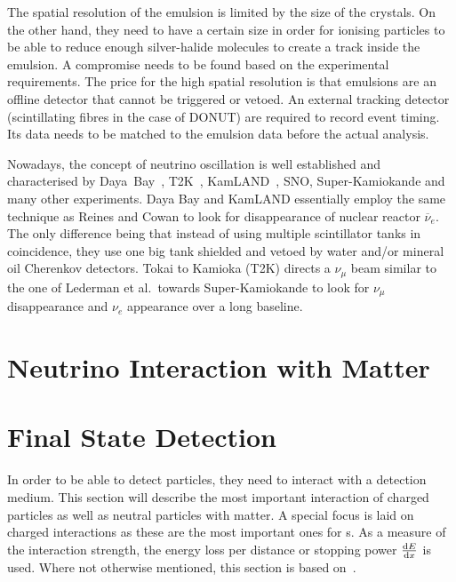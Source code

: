 The spatial resolution of the emulsion is limited by the size of the crystals.
On the other hand, they need to have a certain size in order for ionising particles to be able to reduce enough silver-halide molecules to create a track inside the emulsion.
A compromise needs to be found based on the experimental requirements.
The price for the high spatial resolution is that emulsions are an offline detector that cannot be triggered or vetoed.
An external tracking detector (scintillating fibres in the case of DONUT) are required to record event timing.
Its data needs to be matched to the emulsion data before the actual analysis.

Nowadays, the concept of neutrino oscillation is well established and characterised by Daya~Bay~\cite{dayabayRecent}, T2K~\cite{t2kOsc}, KamLAND~\cite{kamland}, SNO, Super-Kamiokande and many other experiments.
Daya Bay and KamLAND essentially employ the same technique as Reines and Cowan to look for disappearance of nuclear reactor $\overline{\nu}_e$.
The only difference being that instead of using multiple scintillator tanks in coincidence, they use one big tank shielded and vetoed by water and/or mineral oil Cherenkov detectors.
Tokai to Kamioka (T2K) directs a $\nu_{\mu}$ beam similar to the one of Lederman et al.\ towards Super-Kamiokande to look for $\nu_{\mu}$ disappearance and $\nu_e$ appearance over a long baseline.


\section{Neutrino Interaction with Matter}
\label{sec:nu-detection_interactions}


\section{Final State Detection}
\label{sec:nu-detection_fs}

In order to be able to detect particles, they need to interact with a detection medium.
This section will describe the most important interaction of charged particles as well as neutral particles with matter.
A special focus is laid on charged interactions as these are the most important ones for \lartpc s.
As a measure of the interaction strength, the energy loss per distance or stopping power $\dv{E}{x}$ is used.
Where not otherwise mentioned, this section is based on~\cite{grupen}.

